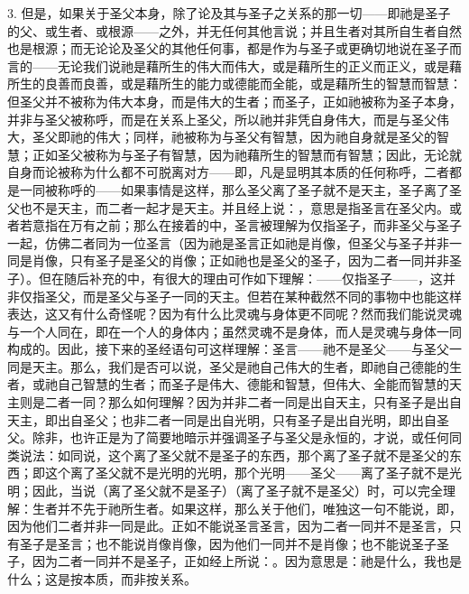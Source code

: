 3. 但是，如果关于圣父本身，除了论及其与圣子之关系的那一切——即祂是圣子的父、或生者、或根源——之外，并无任何其他言说；并且生者对其所自生者自然也是根源；而无论论及圣父的其他任何事，都是作为与圣子或更确切地说在圣子而言的——无论我们说祂是藉所生的伟大而伟大，或是藉所生的正义而正义，或是藉所生的良善而良善，或是藉所生的能力或德能而全能，或是藉所生的智慧而智慧：但圣父并不被称为伟大本身，而是伟大的生者；而圣子，正如祂被称为圣子本身，并非与圣父被称呼，而是在关系上圣父，所以祂并非凭自身伟大，而是与圣父伟大，圣父即祂的伟大；同样，祂被称为与圣父有智慧，因为祂自身就是圣父的智慧；正如圣父被称为与圣子有智慧，因为祂藉所生的智慧而有智慧；因此，无论就自身而论被称为什么都不可脱离对方——即，凡是显明其本质的任何称呼，二者都是一同被称呼的——如果事情是这样，那么圣父离了圣子就不是天主，圣子离了圣父也不是天主，而二者一起才是天主。并且经上说：，意思是指圣言在圣父内。或者若意指在万有之前；那么在接着的中，圣言被理解为仅指圣子，而非圣父与圣子一起，仿佛二者同为一位圣言（因为祂是圣言正如祂是肖像，但圣父与圣子并非一同是肖像，只有圣子是圣父的肖像；正如祂也是圣父的圣子，因为二者一同并非圣子）。但在随后补充的中，有很大的理由可作如下理解：——仅指圣子——，这并非仅指圣父，而是圣父与圣子一同的天主。但若在某种截然不同的事物中也能这样表达，这又有什么奇怪呢？因为有什么比灵魂与身体更不同呢？然而我们能说灵魂与一个人同在，即在一个人的身体内；虽然灵魂不是身体，而人是灵魂与身体一同构成的。因此，接下来的圣经语句可这样理解：圣言——祂不是圣父——与圣父一同是天主。那么，我们是否可以说，圣父是祂自己伟大的生者，即祂自己德能的生者，或祂自己智慧的生者；而圣子是伟大、德能和智慧，但伟大、全能而智慧的天主则是二者一同？那么如何理解？因为并非二者一同是出自天主，只有圣子是出自天主，即出自圣父；也非二者一同是出自光明，只有圣子是出自光明，即出自圣父。除非，也许正是为了简要地暗示并强调圣子与圣父是永恒的，才说，或任何同类说法：如同说，这个离了圣父就不是圣子的东西，那个离了圣子就不是圣父的东西；即这个离了圣父就不是光明的光明，那个光明——圣父——离了圣子就不是光明；因此，当说（离了圣父就不是圣子）（离了圣子就不是圣父）时，可以完全理解：生者并不先于祂所生者。如果这样，那么关于他们，唯独这一句不能说，即，因为他们二者并非一同是此。正如不能说圣言圣言，因为二者一同并不是圣言，只有圣子是圣言；也不能说肖像肖像，因为他们一同并不是肖像；也不能说圣子圣子，因为二者一同并不是圣子，正如经上所说：。因为意思是：祂是什么，我也是什么；这是按本质，而非按关系。\par


